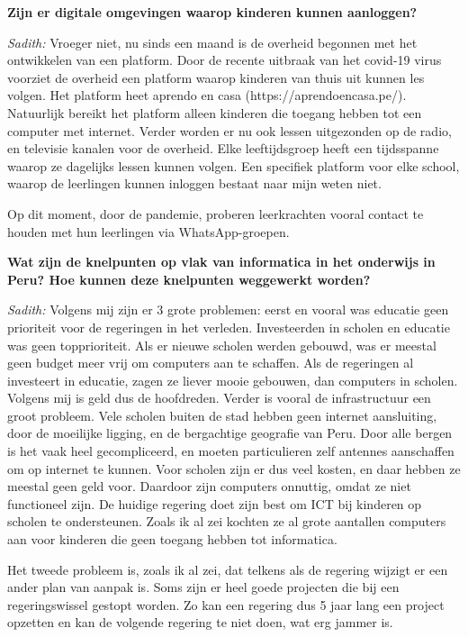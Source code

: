 \textbf{Zijn er digitale omgevingen waarop kinderen kunnen aanloggen?}

\textit{Sadith:} Vroeger niet, nu sinds een maand is de overheid begonnen met het ontwikkelen van een platform. Door de recente uitbraak van het covid-19 virus voorziet de overheid een platform waarop kinderen van thuis uit kunnen les volgen. Het platform heet aprendo en casa (https://aprendoencasa.pe/). Natuurlijk bereikt het platform alleen kinderen die toegang hebben tot een computer met internet. Verder worden er nu ook lessen uitgezonden op de radio, en televisie kanalen voor de overheid. Elke leeftijdsgroep heeft een tijdsspanne waarop ze dagelijks lessen kunnen volgen. Een specifiek platform voor elke school, waarop de leerlingen kunnen inloggen bestaat naar mijn weten niet. 

Op dit moment, door de pandemie, proberen leerkrachten vooral contact te houden met hun leerlingen via WhatsApp-groepen.

\textbf{Wat zijn de knelpunten op vlak van informatica in het onderwijs in Peru? Hoe kunnen deze knelpunten weggewerkt worden?}

\textit{Sadith:} Volgens mij zijn er 3 grote problemen: eerst en vooral was educatie geen prioriteit voor de regeringen in het verleden. Investeerden in scholen en educatie was geen topprioriteit. Als er nieuwe scholen werden gebouwd, was er meestal geen budget meer vrij om computers aan te schaffen. Als de regeringen al investeert in educatie, zagen ze liever mooie gebouwen, dan computers in scholen. Volgens mij is geld dus de hoofdreden. Verder is vooral de infrastructuur een groot probleem. Vele scholen buiten de stad hebben geen internet aansluiting, door de moeilijke ligging, en de bergachtige geografie van Peru. Door alle bergen is het vaak heel gecompliceerd, en moeten particulieren zelf antennes aanschaffen om op internet te kunnen. Voor scholen zijn er dus veel kosten, en daar hebben ze meestal geen geld voor. Daardoor zijn computers onnuttig, omdat ze niet functioneel zijn. De huidige regering doet zijn best om ICT bij kinderen op scholen te ondersteunen. Zoals ik al zei kochten ze al grote aantallen computers aan voor kinderen die geen toegang hebben tot informatica.

Het tweede probleem is, zoals ik al zei, dat telkens als de regering wijzigt er een ander plan van aanpak is. Soms zijn er heel goede projecten die bij een regeringswissel gestopt worden. Zo kan een regering dus 5 jaar lang een project opzetten en kan de volgende regering te niet doen, wat erg jammer is. 

